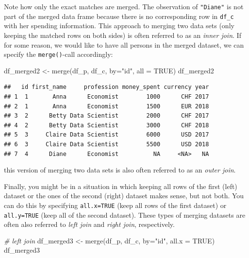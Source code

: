 \documentclass[
  12pt,
]{style/krantz}
\newenvironment{Shaded}{\begin{snugshade}}{\end{snugshade}}
\newcommand{\AttributeTok}[1]{\textcolor[rgb]{0.77,0.63,0.00}{#1}}
\newcommand{\CommentTok}[1]{\textcolor[rgb]{0.56,0.35,0.01}{\textit{#1}}}
\newcommand{\ConstantTok}[1]{\textcolor[rgb]{0.00,0.00,0.00}{#1}}
\newcommand{\FunctionTok}[1]{\textcolor[rgb]{0.00,0.00,0.00}{#1}}
\newcommand{\NormalTok}[1]{#1}
\newcommand{\OtherTok}[1]{\textcolor[rgb]{0.56,0.35,0.01}{#1}}
\newcommand{\StringTok}[1]{\textcolor[rgb]{0.31,0.60,0.02}{#1}}
\begin{document}
Note how only the exact matches are merged. The observation of \texttt{"Diane"} is not part of the merged data frame because there is no corresponding row in \texttt{df\_c} with her spending information. This approach to merging two data sets (only keeping the matched rows on both sides) is often referred to as an \emph{inner join}. If for some reason, we would like to have all persons in the merged dataset, we can specify the \texttt{merge()}-call accordingly:

\begin{Shaded}
\begin{Highlighting}[]
\NormalTok{df\_merged2 }\OtherTok{\textless{}{-}} \FunctionTok{merge}\NormalTok{(df\_p, df\_c, }\AttributeTok{by=}\StringTok{"id"}\NormalTok{, }\AttributeTok{all =} \ConstantTok{TRUE}\NormalTok{)}
\NormalTok{df\_merged2}
\end{Highlighting}
\end{Shaded}

\begin{verbatim}
##   id first_name     profession money_spent currency year
## 1  1       Anna      Economist        1000      CHF 2017
## 2  1       Anna      Economist        1500      EUR 2018
## 3  2      Betty Data Scientist        2000      CHF 2017
## 4  2      Betty Data Scientist        3000      CHF 2018
## 5  3     Claire Data Scientist        6000      USD 2017
## 6  3     Claire Data Scientist        5500      USD 2018
## 7  4      Diane      Economist          NA     <NA>   NA
\end{verbatim}

this version of merging two data sets is also often referred to as an \emph{outer join}.

Finally, you might be in a situation in which keeping all rows of the first (left) dataset or the ones of the second (right) dataset makes sense, but not both. You can do this by specifying \texttt{all.x=TRUE} (keep all rows of the first dataset) or \texttt{all.y=TRUE} (keep all of the second dataset). These types of merging datasets are often also referred to \emph{left join} and \emph{right join}, respectively.

\begin{Shaded}
\begin{Highlighting}[]
\CommentTok{\# left join}
\NormalTok{df\_merged3 }\OtherTok{\textless{}{-}} \FunctionTok{merge}\NormalTok{(df\_p, df\_c, }\AttributeTok{by=}\StringTok{"id"}\NormalTok{, }\AttributeTok{all.x =} \ConstantTok{TRUE}\NormalTok{)}
\NormalTok{df\_merged3}
\end{Highlighting}
\end{Shaded}
\end{document}
